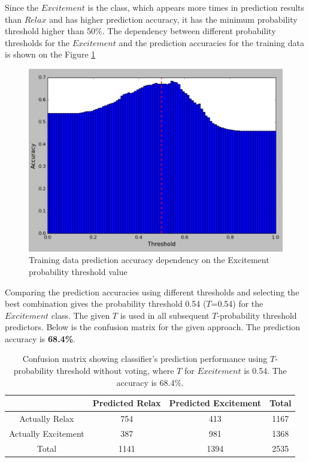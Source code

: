 \documentclass[12pt]{article}
\theoremstyle{definition}
\begin{document}
Since the $Excitement$ is the class, which appears more times in prediction results than $Relax$ and has higher prediction accuracy, it has the minimum probability threshold higher than 50\%. The dependency between different probability thresholds for the $Excitement$ and the prediction accuracies for the training data is shown on the Figure \ref{fig:probability_thresholds}
\begin{figure} [H]
\begin{center}
\includegraphics[width=1\textwidth]{probability_thresholds}
\caption{Training data prediction accuracy dependency on the Excitement probability threshold value}
\label{fig:probability_thresholds}
\end{center}
\end{figure}

Comparing the prediction accuracies using different thresholds and selecting the best combination gives the probability threshold 0.54 ($T$=0.54) for the $Excitement$ class. The given $T$ is used in all subsequent $T$-probability threshold predictors. Below is the confusion matrix for the given approach. The prediction accuracy is \textbf{68.4\%}.

\begin{table}[H]
\begin{center}
  \begin{tabular}{ | c | c | c | c | }
    \hline
     & Predicted Relax & Predicted Excitement & Total \\ \hline
    Actually Relax & 754 & 413 & 1167 \\ \hline
    Actually Excitement & 387 & 981 & 1368 \\ \hline
    Total & 1141 & 1394 & 2535 \\ 
    \hline
  \end{tabular}
\end{center}
\caption{Confusion matrix showing classifier's prediction performance using $T$-probability threshold without voting, where $T$ for $Excitement$ is 0.54. The accuracy is 68.4\%.} \label{tab:title} 
\end{table}
\end{document}
